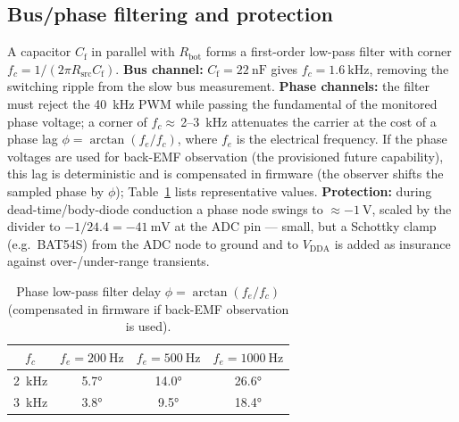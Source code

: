 \documentclass[journal,onecolumn,11pt]{IEEEtran}
\begin{document}
\subsection{Bus/phase filtering and protection}\label{sec:vfilter}
A capacitor $C_{\mathrm{f}}$ in parallel with $R_{\mathrm{bot}}$ forms a first-order low-pass filter
with corner $f_c=1/(2\pi R_{\mathrm{src}}C_{\mathrm{f}})$.
\textbf{Bus channel:} $C_{\mathrm{f}}=\SI{22}{\nano\farad}$ gives $f_c=\SI{1.6}{\kilo\hertz}$, removing
the switching ripple from the slow bus measurement. \textbf{Phase channels:} the filter must reject
the \SI{40}{\kilo\hertz} PWM while passing the fundamental of the monitored phase voltage; a corner
of $f_c\approx$\,2--\SI{3}{\kilo\hertz} attenuates the carrier at the cost of a phase lag
$\phi=\arctan(f_e/f_c)$, where $f_e$ is the electrical frequency. If the phase voltages are used for
back-EMF observation (the provisioned future capability), this lag is deterministic and is
compensated in firmware (the observer shifts the sampled phase by $\phi$); Table~\ref{tab:phase}
lists representative values. \textbf{Protection:} during dead-time/body-diode conduction a phase node
swings to $\approx-\SI{1}{\volt}$, scaled by the divider to $-1/24.4=-\SI{41}{\milli\volt}$ at the
ADC pin --- small, but a Schottky clamp (e.g.\ BAT54S) from the ADC node to ground and to
$V_{\mathrm{DDA}}$ is added as insurance against over-/under-range transients.

\begin{table}[!t]
\centering
\caption{Phase low-pass filter delay $\phi=\arctan(f_e/f_c)$ (compensated in firmware if back-EMF observation is used).}
\label{tab:phase}
\renewcommand{\arraystretch}{1.2}
\begin{tabular}{c c c c}
\toprule
$f_c$ & $f_e=\SI{200}{\hertz}$ & $f_e=\SI{500}{\hertz}$ & $f_e=\SI{1000}{\hertz}$\\
\midrule
\SI{2}{\kilo\hertz} & \ang{5.7} & \ang{14.0} & \ang{26.6}\\
\SI{3}{\kilo\hertz} & \ang{3.8} & \ang{9.5}  & \ang{18.4}\\
\bottomrule
\end{tabular}
\end{table}
\end{document}
